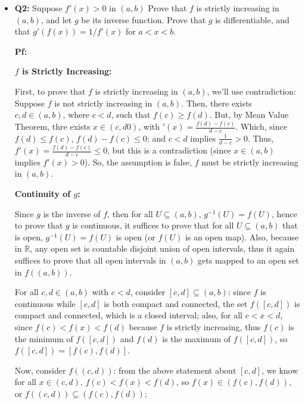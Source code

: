 \documentclass{article}
\begin{document}
\hfill

\begin{itemize}
    \item \begin{myBox}[]{}
        \textbf{Q2:} Suppose $f'(x)>0$ in $(a,b)$ Prove that $f$ is strictly increasing in $(a,b)$, and let $g$ be its inverse function. 
        Prove that $g$ is differentiable, and that $g'(f(x))=1/f'(x)$ for $a<x<b$.
    \end{myBox}

    \textbf{Pf:}

    \textbf{$f$ is Strictly Increasing:}

    First, to prove that $f$ is strictly increasing in $(a,b)$, we'll use contradiction: Suppose $f$ is not strictly increasing in $(a,b)$.
    Then, there exists $c,d\in (a,b)$, where $c<d$, such that $f(c)\geq f(d)$. But, by Mean Value Theorem, thre exists $x\in (c,d0)$, with $'(x)=\frac{f(d)-f(c)}{d-c}$.
    Which, since $f(d)\leq f(c)$, $f(d)-f(c)\leq 0$; and $c<d$ implies $\frac{1}{d-c}>0$. Thus, $f'(x)=\frac{f(d)-f(c)}{d-c}\leq 0$, but this is a contradiction (since $x\in (a,b)$ implies $f'(x)>0$).
    So, the assumption is false, $f$ must be strictly increasing in $(a,b)$.

    \hfill

    \textbf{Continuity of $g$:}

    Since $g$ is the inverse of $f$, then for all $U\subseteq (a,b)$, $g^{-1}(U)=f(U)$,
    hence to prove that $g$ is continuous, it suffices to prove that for all $U\subseteq (a,b)$ that is open,
    $g^{-1}(U)=f(U)$ is open (or $f(U)$ is an open map). Also, because in $\mathbb{R}$, any open set is countable
    disjoint union of open intervals, thus it again suffices to prove that all open intervals in $(a,b)$ gets mapped to an open set in $f((a,b))$.

    For all $c,d\in (a,b)$ with $c<d$, consider $[c,d]\subseteq (a,b)$: since $f$ is continuous while $[c,d]$ is both compact and connected,
    the set $f([c,d])$ is compact and connected, which is a closed interval; also, for all $c<x<d$, since $f(c)<f(x)<f(d)$ because $f$ is strictly increasing,
    thus $f(c)$ is the minimum of $f([c,d])$ and $f(d)$ is the maximum of $f([c,d])$, so $f([c,d])=[f(c),f(d)]$.

    \hfill

    Now, consider $f((c,d))$: from the above statement about $[c,d]$, we know for all $x\in (c,d)$, $f(c)<f(x)<f(d)$,
    so $f(x)\in (f(c),f(d))$, or $f((c,d))\subseteq (f(c),f(d))$;


\end{itemize}
\end{document}
